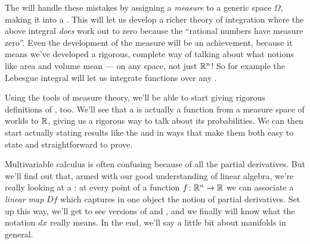 \begin{itemize}
The  will handle these mistakes
by assigning a \emph{measure} to a generic space $\Omega$,
making it into a .
This will let us develop a richer theory of integration
where the above integral \emph{does} work out to zero
because the ``rational numbers have measure zero''.
Even the development of the measure will be an achievement,
because it means we've developed a rigorous, complete way
of talking about what notions like area and volume mean ---
on any space, not just $\mathbb R^n$!
So for example the Lebesgue integral will let us
integrate functions over any .

Using the tools of measure theory, we'll be able to start
giving rigorous definitions of , too.
We'll see that a  is actually
a function from a measure space of worlds to $\mathbb R$,
giving us a rigorous way to talk about its probabilities.
We can then start actually stating results like
the  and 
in ways that make them both easy to state and straightforward to prove.

Multivariable calculus is often confusing
because of all the partial derivatives.
But we'll find out that, armed with our good understanding
of linear algebra, we're really looking at a :
at every point of a function $f \colon \mathbb R^n \to \mathbb R$
we can associate a \emph{linear map} $Df$ which
captures in one object the notion of partial derivatives.
Set up this way, we'll get to see versions of 
and ,
and we finally will know what the notation $dx$ really means.
In the end, we'll say a little bit about manifolds in general.
\end{itemize}

